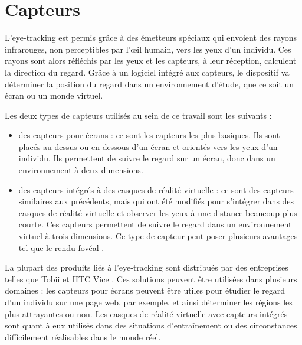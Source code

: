 \documentclass[hidelinks,12pt]{article}
\begin{document}

\section{Capteurs}

L'eye-tracking est permis grâce à des émetteurs spéciaux qui envoient des rayons
infrarouges, non perceptibles par l'œil humain, vers les yeux d'un individu.
Ces rayons sont alors réfléchis par les yeux et les capteurs, à leur réception,
calculent la direction du regard. Grâce à un logiciel intégré aux capteurs, le
dispositif va déterminer la position du regard dans un environnement d'étude,
que ce soit un écran ou un monde virtuel.

\bigskip
Les deux types de capteurs utilisés au sein de ce travail sont les suivants :
\begin{itemize}
  \item des capteurs pour écrans : ce sont les capteurs les plus basiques. Ils
        sont placés au-dessus ou en-dessous d'un écran et orientés vers les yeux
        d'un individu. Ils permettent de suivre le regard sur un écran, donc
        dans un environnement à deux dimensions.
  \item des capteurs intégrés à des casques de réalité virtuelle : ce sont des
        capteurs similaires aux précédents, mais qui ont été modifiés pour
        s'intégrer dans des casques de réalité virtuelle et observer les yeux à
        une distance beaucoup plus courte. Ces capteurs permettent de suivre le
        regard dans un environnement virtuel à trois dimensions. Ce type de
        capteur peut poser plusieurs avantages tel que le rendu fovéal
        \cite{wiki_foveated_rendering}.
\end{itemize}

\bigskip
La plupart des produits liés à l'eye-tracking sont distribués par des
entreprises telles que Tobii \cite{tobii} et HTC Vice \cite{htc_vive_pro_eye}.
Ces solutions peuvent être utilisées dans plusieurs domaines \cite{yt_tobii_vr}
: les capteurs pour écrans peuvent être utiles pour étudier le regard d'un
individu sur une page web, par exemple, et ainsi déterminer les régions les
plus attrayantes ou non. Les casques de réalité virtuelle avec capteurs
intégrés sont quant à eux utilisés dans des situations d'entraînement ou des
circonstances difficilement réalisables dans le monde réel.
\end{document}
